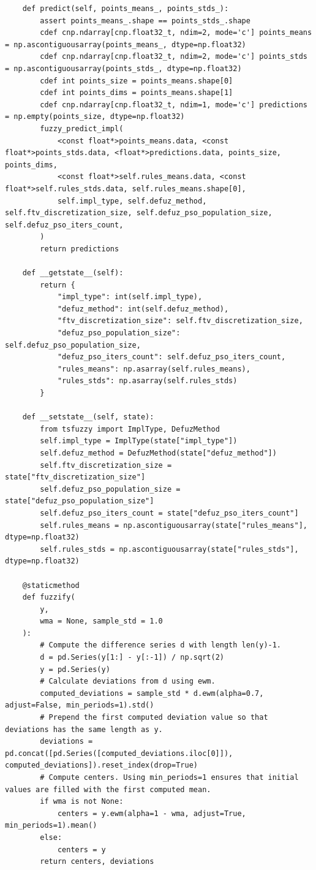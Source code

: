 \begin{verbatim}
    def predict(self, points_means_, points_stds_):
        assert points_means_.shape == points_stds_.shape
        cdef cnp.ndarray[cnp.float32_t, ndim=2, mode='c'] points_means = np.ascontiguousarray(points_means_, dtype=np.float32)
        cdef cnp.ndarray[cnp.float32_t, ndim=2, mode='c'] points_stds = np.ascontiguousarray(points_stds_, dtype=np.float32)
        cdef int points_size = points_means.shape[0]
        cdef int points_dims = points_means.shape[1]
        cdef cnp.ndarray[cnp.float32_t, ndim=1, mode='c'] predictions = np.empty(points_size, dtype=np.float32)
        fuzzy_predict_impl(
            <const float*>points_means.data, <const float*>points_stds.data, <float*>predictions.data, points_size, points_dims,
            <const float*>self.rules_means.data, <const float*>self.rules_stds.data, self.rules_means.shape[0],
            self.impl_type, self.defuz_method, self.ftv_discretization_size, self.defuz_pso_population_size, self.defuz_pso_iters_count,
        )
        return predictions

    def __getstate__(self):
        return {
            "impl_type": int(self.impl_type),
            "defuz_method": int(self.defuz_method),
            "ftv_discretization_size": self.ftv_discretization_size,
            "defuz_pso_population_size": self.defuz_pso_population_size,
            "defuz_pso_iters_count": self.defuz_pso_iters_count,
            "rules_means": np.asarray(self.rules_means),
            "rules_stds": np.asarray(self.rules_stds)
        }

    def __setstate__(self, state):
        from tsfuzzy import ImplType, DefuzMethod
        self.impl_type = ImplType(state["impl_type"])
        self.defuz_method = DefuzMethod(state["defuz_method"])
        self.ftv_discretization_size = state["ftv_discretization_size"]
        self.defuz_pso_population_size = state["defuz_pso_population_size"]
        self.defuz_pso_iters_count = state["defuz_pso_iters_count"]
        self.rules_means = np.ascontiguousarray(state["rules_means"], dtype=np.float32)
        self.rules_stds = np.ascontiguousarray(state["rules_stds"], dtype=np.float32)

    @staticmethod
    def fuzzify(
        y,
        wma = None, sample_std = 1.0
    ):
        # Compute the difference series d with length len(y)-1.
        d = pd.Series(y[1:] - y[:-1]) / np.sqrt(2)
        y = pd.Series(y)
        # Calculate deviations from d using ewm.
        computed_deviations = sample_std * d.ewm(alpha=0.7, adjust=False, min_periods=1).std()
        # Prepend the first computed deviation value so that deviations has the same length as y.
        deviations = pd.concat([pd.Series([computed_deviations.iloc[0]]), computed_deviations]).reset_index(drop=True)
        # Compute centers. Using min_periods=1 ensures that initial values are filled with the first computed mean.
        if wma is not None:
            centers = y.ewm(alpha=1 - wma, adjust=True, min_periods=1).mean()
        else:
            centers = y
        return centers, deviations
\end{verbatim}
